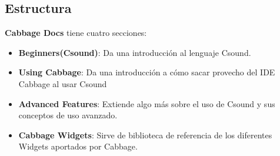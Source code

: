 \subsection{Estructura}

\textbf{Cabbage Docs} tiene cuatro secciones:
 \begin{itemize}
 \item \textbf{Beginners(Csound)}: Da una introducción al lenguaje Csound.
 
 \item \textbf{Using Cabbage}: Da una introducción a cómo sacar provecho del IDE Cabbage al usar Csound
 
 \item \textbf{Advanced Features}: Extiende algo más sobre el uso de Csound y sus conceptos de uso avanzado.
 
 \item \textbf{Cabbage Widgets}: Sirve de biblioteca de referencia de los diferentes Widgets aportados por Cabbage.
 \end{itemize} 